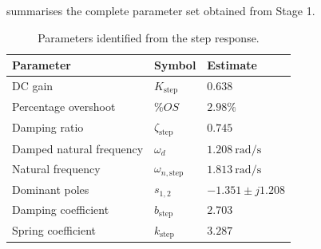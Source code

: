 \documentclass[12pt,a4paper]{article}
\begin{document}
 summarises the complete parameter set
obtained from Stage 1.

\begin{table}[H]
    \centering
    \caption{Parameters identified from the step response.}
    \label{tab:stepparams}

    \renewcommand{\arraystretch}{1.35}

    \begin{tabular}{
        |>{\raggedright\arraybackslash}p{}
        |>{\centering\arraybackslash}p{}
        |>{\centering\arraybackslash}p{}|
    }
        \hline

        \rowcolor{gray!15}
        \textbf{Parameter} &
        \textbf{Symbol} &
        \textbf{Estimate} \\

        \hline

        DC gain &
        $K_{\mathrm{step}}$ &
        $0.638$ \\

        \hline

        Percentage overshoot &
        $\%OS$ &
        $2.98\%$ \\

        \hline

        Damping ratio &
        $\zeta_{\mathrm{step}}$ &
        $0.745$ \\

        \hline

        Damped natural frequency &
        $\omega_d$ &
        $1.208~\mathrm{rad/s}$ \\

        \hline

        Natural frequency &
        $\omega_{n,\mathrm{step}}$ &
        $1.813~\mathrm{rad/s}$ \\

        \hline

        Dominant poles &
        $s_{1,2}$ &
        $-1.351 \pm j1.208$ \\

        \hline

        Damping coefficient &
        $b_{\mathrm{step}}$ &
        $2.703$ \\

        \hline

        Spring coefficient &
        $k_{\mathrm{step}}$ &
        $3.287$ \\

        \hline
    \end{tabular}
\end{table}
\end{document}
